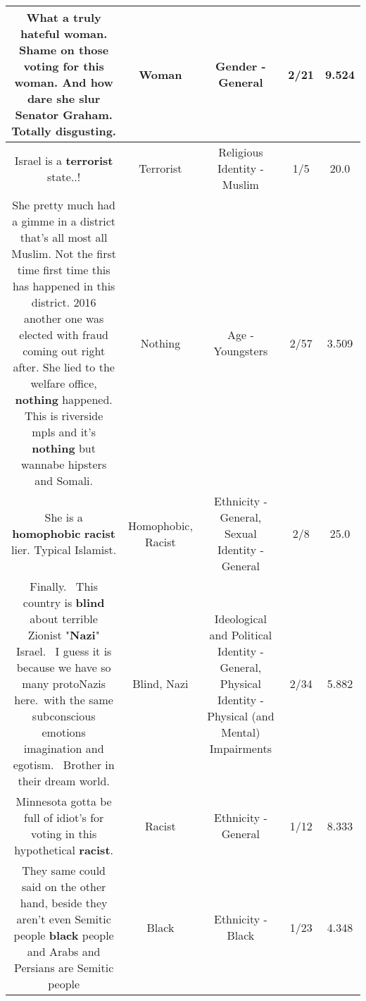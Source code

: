 \documentclass[11pt]{article}
\newlength\mylength
\begin{document}
\begin{center}
\begin{longtable}{|C{.65\mylength}|C{.30\mylength}|C{.12\mylength}|C{.12\mylength}|C{.12\mylength}|}
  \small What a truly hateful \textbf{woman}.  Shame on those voting for this \textbf{woman}.  And how dare she slur Senator Graham. Totally disgusting.\normalsize   & Woman & Gender - General & 2/21 & 9.524 \\  \hline
  \small Israel is a \textbf{terrorist} state..!\normalsize   & Terrorist & Religious Identity - Muslim & 1/5 & 20.0 \\  \hline
  \small She pretty much had a gimme in a district that's all most all Muslim. Not the first time first time this has happened in this district. 2016 another one was elected with fraud coming out right after. She lied to the welfare office, \textbf{nothing} happened. This is riverside mpls and it's \textbf{nothing} but wannabe hipsters and Somali.\normalsize   & Nothing & Age - Youngsters & 2/57 & 3.509 \\  \hline
  \small She is a \textbf{homophobic} \textbf{racist} lier. Typical Islamist.\normalsize   & Homophobic, Racist & Ethnicity - General, Sexual Identity - General & 2/8 & 25.0 \\  \hline
  \small Finally.  This country is \textbf{blind} about terrible Zionist "\textbf{Nazi}" Israel.  I guess it is because we have so many protoNazis here. with the same subconscious emotions imagination and egotism.  Brother in their dream world.\normalsize   & Blind, Nazi &  Ideological and Political Identity - General, Physical Identity - Physical (and Mental) Impairments & 2/34 & 5.882 \\  \hline
  \small Minnesota gotta be full of idiot's for voting in this hypothetical \textbf{racist}.\normalsize   & Racist & Ethnicity - General & 1/12 & 8.333 \\  \hline
  \small They same could said on the other hand, beside they aren't even Semitic people \textbf{black} people and Arabs and Persians are Semitic people\normalsize   & Black & Ethnicity - Black & 1/23 & 4.348 \\  \hline

\end{longtable}
\end{center}
\end{document}
